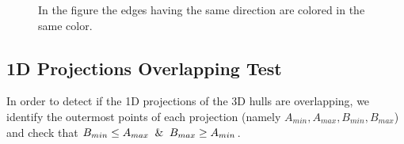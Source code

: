 \documentclass{PoliMi_MasterThesis}
\begin{document}
\begin{figure}[H]
    \centering
		\qquad
	\caption{In the figure the edges having the same direction are colored in the same color.}
    \label{fig:aabb_frustum_different_edges_directions}
\end{figure}


\subsection{1D Projections Overlapping Test} \label{ssec:1d_projection_overlapping_test}
In order to detect if the 1D projections of the 3D hulls are overlapping, we identify the outermost points of each projection (namely $A_{min}, A_{max}, B_{min}, B_{max}$) and check that $B_{min} \leq A_{max} \And B_{max} \geq A_{min}$.
\end{document}
